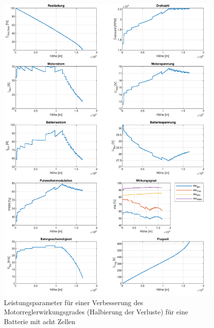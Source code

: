 \begin{appendix}
\begin{figure}[H]
\centering
	\includegraphics[scale=0.7]{Diagramme/Untersuchung_eta_pwm_halbierung_8.pdf}
	\caption{Leistungsparameter für einer Verbesserung des Motorreglerwirkungsgrades (Halbierung der Verluste) für eine Batterie mit acht Zellen}
	\label{abb:eta_pwm_8_halb}
\end{figure}


\end{appendix}
